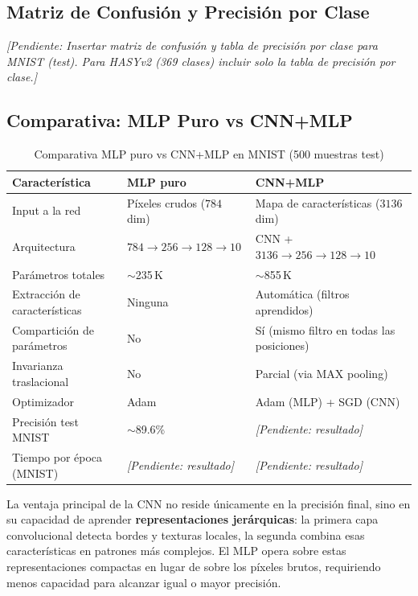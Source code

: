 \documentclass[12pt,a4paper]{article}
\newcommand{\todo}[1]{\textit{\textcolor{codegray}{[Pendiente: #1]}}}
\begin{document}
\subsection{Matriz de Confusión y Precisión por Clase}

\todo{Insertar matriz de confusión y tabla de precisión por clase para MNIST (test).
Para HASYv2 (369 clases) incluir solo la tabla de precisión por clase.}

\subsection{Comparativa: MLP Puro vs CNN+MLP}

\begin{table}[H]
\centering
\caption{Comparativa MLP puro vs CNN+MLP en MNIST (500 muestras test)}
\label{tab:comparativa}
\begin{tabular}{lll}
\toprule
\textbf{Característica}        & \textbf{MLP puro}              & \textbf{CNN+MLP} \\
\midrule
Input a la red                 & Píxeles crudos ($784$ dim)     & Mapa de características ($3136$ dim) \\
Arquitectura                   & $784\to256\to128\to10$         & CNN + $3136\to256\to128\to10$ \\
Parámetros totales             & $\sim$235\,K                   & $\sim$855\,K \\
Extracción de características  & Ninguna                        & Automática (filtros aprendidos) \\
Compartición de parámetros     & No                             & Sí (mismo filtro en todas las posiciones) \\
Invarianza traslacional        & No                             & Parcial (via MAX pooling) \\
Optimizador                    & Adam                           & Adam (MLP) + SGD (CNN) \\
Precisión test MNIST           & $\sim$89.6\%                   & \todo{resultado} \\
Tiempo por época (MNIST)       & \todo{resultado}               & \todo{resultado} \\
\bottomrule
\end{tabular}
\end{table}

La ventaja principal de la CNN no reside únicamente en la precisión final, sino en su
capacidad de aprender \textbf{representaciones jerárquicas}: la primera capa
convolucional detecta bordes y texturas locales, la segunda combina esas características
en patrones más complejos. El MLP opera sobre estas representaciones compactas en lugar
de sobre los píxeles brutos, requiriendo menos capacidad para alcanzar igual o mayor
precisión.
\end{document}
